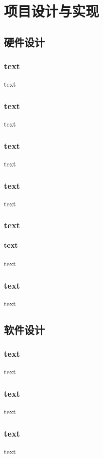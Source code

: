 
\chapter{项目设计与实现}

\section{硬件设计}

\subsection{text}
text
\subsection{text}
text
\subsection{text}
text
\subsection{text}
text
\subsection{text}
\subsubsection{text}
text
\subsection{text}
text

\section{软件设计}
\subsection{text}
text
\subsection{text}
text
\subsection{text}
text





